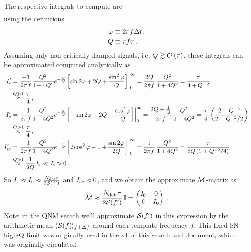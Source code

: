 \documentclass[aps,prd,onecolumn,notitlepage,nofootinbib,superscriptaddress,altaffilletter,floatfix]{revtex4-1}
\begin{document}
The respective integrals to compute are
\begin{align}
  \label{eq:18}
\end{align}
using the definitions
\begin{align}
  \label{eq:3}
  \varphi &\equiv 2\pi f \Delta t\,,\\
  Q       &\equiv \pi f \tau\,.
\end{align}
Assuming only non-critically damped signals, i.e. $Q\gtrsim \mathcal{O}\left(\pi\right)$, these integrals can be approximated computed analytically as
\begin{align}
  \label{eq:19}
  I_{\mathrm{s}}' &= \left. \frac{-1}{2\pi f}\frac{Q^2}{1 + 4Q^2}e^{-\frac{\varphi}{Q}}\left[ \sin2\varphi + 2Q + \frac{\sin^2\varphi}{Q}\right]\right|_0^\infty
  = \frac{2Q}{2\pi f}\,\frac{Q^2}{1+4Q^2}
  = \frac{\tau}{4 + Q^{-2}} \\
  & \stackrel{Q\gg1}{\approx} \frac{\tau}{4}\,,\\
  I_{\mathrm{c}}' &= \left. \frac{-1}{2\pi f}\frac{Q^2}{1 + 4Q^2}e^{-\frac{\varphi}{Q}}\left[ -\sin2\varphi + 2Q + \frac{\cos^2\varphi}{Q}\right]\right|_0^\infty
  = \frac{2Q + \frac{1}{Q}}{2\pi f}\,\frac{Q^2}{1+4Q^2} = \frac{\tau}{4}\,\left(\frac{2 + Q^{-2}}{2 + Q^{-2}/2}\right) \\
  & \stackrel{Q\gg1}{\approx} \frac{\tau}{4}\,,\\
  I_{\mathrm{sc}}' &= \left. \frac{-1}{2\pi f}\frac{Q^2}{1 + 4Q^2}e^{-\frac{\varphi}{Q}}\left[ 2\cos^2\varphi - 1 + \frac{\sin2\varphi}{2Q}\right]\right|_0^\infty
  = \frac{1}{2\pi f}\,\frac{Q^2}{1+4Q^2} = \frac{\tau}{8Q\,(1 + Q^{-2}/4)}\\
  &\stackrel{Q\gg1}{\approx} \frac{1}{2Q}\,I_{\mathrm{s}} \ll I_{\mathrm{s}} \approx 0\,.
\end{align}
So $I_{\mathrm{s}} \approx I_{\mathrm{c}} \approx \frac{N_{\mathrm{det}}\tau}{2\mathcal{S}(f')}$ and $I_{\mathrm{sc}}\approx 0$, and we obtain the approximate $\mathcal{M}$-matrix as
\begin{equation}
  \label{eq:42}
  \mathcal{M} \approx \frac{N_{\mathrm{det}}\,\tau}{2\mathcal{S}(f')}\,\mathbb{I} = \begin{pmatrix} I_0 & 0 \\ 0 & I_0 \end{pmatrix}\,.
\end{equation}
Note: in the QNM search we'll approximate $\mathcal{S}(f')$ in this expression by the arithmetic mean $\langle\mathcal{S}(f)\rangle_{f\pm\Delta f}$ around each
template frequency $f$. This fixed-SN high-Q limit was originally used in the \href{https://dcc.ligo.org/LIGO-G1600153-v1}{v1} of this search and
document, which was originally circulated.


\end{document}
